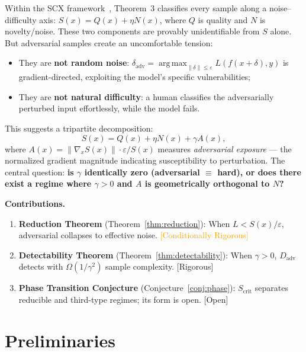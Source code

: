 \documentclass[12pt,a4paper]{article}
\newcommand{\rigorous}{\textcolor{green!50!black}{\small\textsf{[Rigorous]}}}
\newcommand{\conditionallyrigorous}{\textcolor{orange}{\small\textsf{[Conditionally Rigorous]}}}
\newcommand{\openquest}{\textcolor{red!70!black}{\small\textsf{[Open]}}}
\newcommand{\argmax}{\operatorname*{arg\,max}}
\begin{document}
Within the \textsf{SCX} framework~\citep{scx2024cercis}, Theorem~3 classifies every
sample along a noise--difficulty axis: $S(x) = Q(x) + \eta N(x)$, where
$Q$ is quality and $N$ is novelty/noise.  These two components are provably
unidentifiable from $S$ alone.  But adversarial samples create an
uncomfortable tension:
\begin{itemize}
    \item They are \textbf{not random noise}: $\delta_{\mathrm{adv}} =
          \argmax_{\|\delta\|\leq\varepsilon} L(f(x+\delta), y)$ is
          gradient-directed, exploiting the model's specific vulnerabilities;
    \item They are \textbf{not natural difficulty}: a human classifies the
          adversarially perturbed input effortlessly, while the model fails.
\end{itemize}

This suggests a tripartite decomposition:
\begin{equation}\label{eq:tripartite}
    S(x) = Q(x) + \eta N(x) + \gamma A(x),
\end{equation}
where $A(x) = \|\nabla_x S(x)\| \cdot \varepsilon / S(x)$ measures
\emph{adversarial exposure} --- the normalized gradient magnitude indicating
susceptibility to perturbation.  The central question: \textbf{is $\gamma$
identically zero (adversarial $\equiv$ hard), or does there exist a regime
where $\gamma > 0$ and $A$ is geometrically orthogonal to $N$?}

\medskip\noindent
\textbf{Contributions.}
\begin{enumerate}[label=(\arabic*)]
    \item \textbf{Reduction Theorem} (Theorem~\ref{thm:reduction}):
          When $L < S(x)/\varepsilon$, adversarial collapses to effective
          noise.  \conditionallyrigorous
    \item \textbf{Detectability Theorem} (Theorem~\ref{thm:detectability}):
          When $\gamma > 0$, $D_{\mathrm{adv}}$ detects with
          $\Omega(1/\gamma^2)$ sample complexity.  \rigorous
    \item \textbf{Phase Transition Conjecture} (Conjecture~\ref{conj:phase}):
          $S_{\mathrm{crit}}$ separates reducible and third-type regimes;
          its form is open.  \openquest
\end{enumerate}

\section{Preliminaries}
\end{document}
